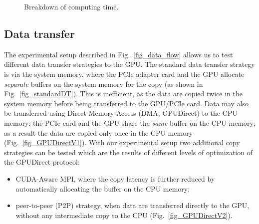 \documentclass[letterpaper]{jpconf}
\begin{document}
\begin{figure}[!t]
\centering
\caption{Breakdown of computing time.}
\end{figure}

\subsection{Data transfer}
The experimental setup described in Fig.~\ref{fig_data_flow} allows us to 
test different data transfer  strategies to the GPU. The standard data transfer 
strategy is via the system memory, where the 
PCIe adapter card and the GPU allocate \emph{separate} buffers on the
system memory for the copy (as shown in Fig.~\ref{fig_standardDT}).
This is inefficient, as the data are copied twice in the 
system memory before being transferred to the GPU/PCIe card. 
Data may also be transferred using Direct Memory Access (DMA, 
GPUDirect\cite{bib_GPUDirect}) to the CPU memory:
the PCIe card and the GPU share the \textit{same} buffer on the CPU memory; as 
a result the data are copied only once in the CPU memory 
(Fig.~\ref{fig_GPUDirectV1}). 
With our experimental setup two additional copy strategies can be tested
which are the results of different levels of 
optimization of the GPUDirect protocol:
\begin{itemize}
\item CUDA-Aware MPI, where the copy latency is further reduced
by automatically allocating the buffer on the CPU memory;
\item peer-to-peer (P2P) strategy, when data are transferred 
directly to the GPU, without any  
intermediate copy to the CPU (Fig.~\ref{fig_GPUDirectV2}).
\end{itemize}
\end{document}
